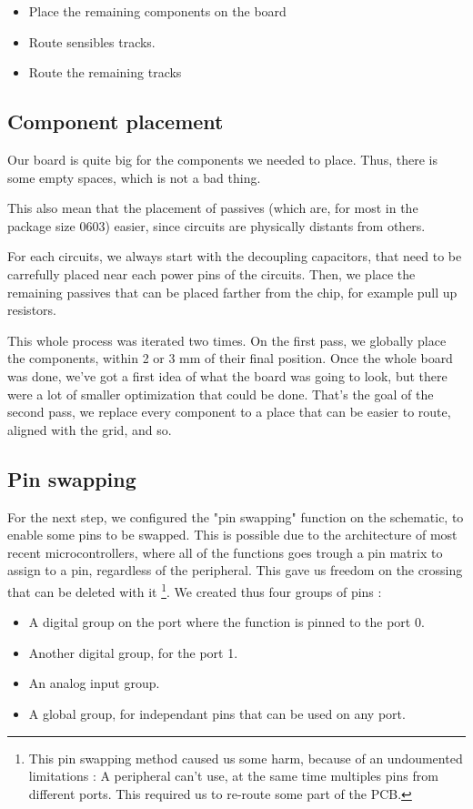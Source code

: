 \begin{itemize}
    \item   Place the remaining components on the board 
    \item   Route sensibles tracks.
    \item   Route the remaining tracks
\end{itemize}

\subsection{Component placement}
Our board is quite big for the components we needed to place. Thus, there is some empty spaces, 
which is not a bad thing.

This also mean that the placement of passives (which are, for most in the package size 0603) 
easier, since circuits are physically distants from others.

For each circuits, we always start with the decoupling capacitors, that need to be carrefully
placed near each power pins of the circuits. Then, we place the remaining passives that can 
be placed farther from the chip, for example pull up resistors.

This whole process was iterated two times. On the first pass, we globally place the components,
within 2 or 3 mm of their final position. Once the whole board was done, we've got a first idea 
of what the board was going to look, but there were a lot of smaller optimization that could be 
done. That's the goal of the second pass, we replace every component to a place that can be easier 
to route, aligned with the grid, and so.

\subsection{Pin swapping}
For the next step, we configured the "pin swapping" function on the schematic, to enable some pins 
to be swapped. This is possible due to the architecture of most recent microcontrollers, where all 
of the functions goes trough a pin matrix to assign to a pin, regardless of the peripheral. This 
gave us freedom on the crossing that can be deleted with it \footnote{
    This pin swapping method caused us some harm, because of an undoumented limitations : A 
    peripheral can't use, at the same time multiples pins from different ports. This required 
    us to re-route some part of the PCB.
}.
We created thus four groups of pins : 
\begin{itemize}
    \item   A digital group on the port where the function is pinned to the port 0.
    \item   Another digital group, for the port 1.
    \item   An analog input group.
    \item   A global group, for independant pins that can be used on any port.
\end{itemize}

